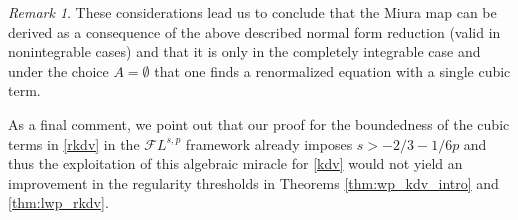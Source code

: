 \documentclass[%
11pt,  reqno]{amsart}
\newcommand{\5}{\textup{V}}
\newcommand{\FL}{\mathcal{F} L}
\theoremstyle{remark}
\newtheorem{remark}[theorem]{Remark}
\newcommand{\R}{\mathbb{R}}
\numberwithin{equation}{section}
\numberwithin{theorem}{section}
\begin{document}
\begin{remark}
		These considerations lead us to conclude that the Miura map can be derived as a consequence of the above described normal form reduction (valid in nonintegrable cases) and that it is only in the completely integrable case and under the choice $A=\emptyset$ that one finds a renormalized equation with a single cubic term.
		
		As a final comment, we point out that our proof for the boundedness of the cubic terms in \eqref{rkdv} in the $\mathcal{F}L^{s,p}$ framework already imposes $s>-2/3-1/6p$ and thus the exploitation of this algebraic miracle for \eqref{kdv} would not yield an improvement in the regularity thresholds in Theorems \ref{thm:wp_kdv_intro} and \ref{thm:lwp_rkdv}. 
	\end{remark}
    
	
	
\end{document}
